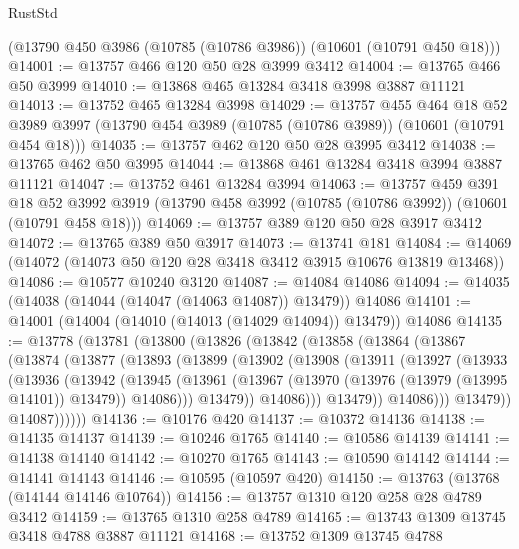 \begin{lexlean}{RustStd}
\begin{coremodule}
    (@13790 @450 @3986 (@10785 (@10786 @3986)) (@10601 (@10791 @450 @18)))
@14001 := @13757 @466 @120 @50 @28 @3999 @3412
@14004 := @13765 @466 @50 @3999
@14010 := @13868 @465 @13284 @3418 @3998 @3887 @11121
@14013 := @13752 @465 @13284 @3998
@14029 := @13757
    @455
    @464
    @18
    @52
    @3989
    @3997
    (@13790 @454 @3989 (@10785 (@10786 @3989)) (@10601 (@10791 @454 @18)))
@14035 := @13757 @462 @120 @50 @28 @3995 @3412
@14038 := @13765 @462 @50 @3995
@14044 := @13868 @461 @13284 @3418 @3994 @3887 @11121
@14047 := @13752 @461 @13284 @3994
@14063 := @13757
    @459
    @391
    @18
    @52
    @3992
    @3919
    (@13790 @458 @3992 (@10785 (@10786 @3992)) (@10601 (@10791 @458 @18)))
@14069 := @13757 @389 @120 @50 @28 @3917 @3412
@14072 := @13765 @389 @50 @3917
@14073 := @13741 @181
@14084 := @14069 (@14072 (@14073 @50 @120 @28 @3418 @3412 @3915 @10676 @13819 @13468))
@14086 := @10577 @10240 @3120
@14087 := @14084 @14086
@14094 := @14035 (@14038 (@14044 (@14047 (@14063 @14087)) @13479)) @14086
@14101 := @14001 (@14004 (@14010 (@14013 (@14029 @14094)) @13479)) @14086
@14135 := @13778
    (@13781
      (@13800
        (@13826
          (@13842
            (@13858
              (@13864
                (@13867
                  (@13874
                    (@13877
                      (@13893
                        (@13899
                          (@13902
                            (@13908
                              (@13911
                                (@13927
                                  (@13933
                                    (@13936
                                      (@13942
                                        (@13945
                                          (@13961
                                            (@13967
                                              (@13970 (@13976 (@13979 (@13995 @14101)) @13479))
                                              @14086)))
                                        @13479))
                                    @14086)))
                              @13479))
                          @14086)))
                    @13479))
                @14087))))))
@14136 := @10176 @420
@14137 := @10372 @14136
@14138 := @14135 @14137
@14139 := @10246 @1765
@14140 := @10586 @14139
@14141 := @14138 @14140
@14142 := @10270 @1765
@14143 := @10590 @14142
@14144 := @14141 @14143
@14146 := @10595 (@10597 @420)
@14150 := @13763 (@13768 (@14144 @14146 @10764))
@14156 := @13757 @1310 @120 @258 @28 @4789 @3412
@14159 := @13765 @1310 @258 @4789
@14165 := @13743 @1309 @13745 @3418 @4788 @3887 @11121
@14168 := @13752 @1309 @13745 @4788

\end{coremodule}
\end{lexlean}
